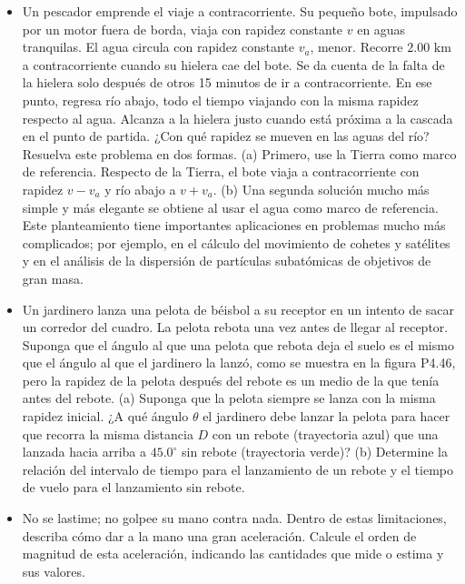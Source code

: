 \documentclass[11pt,a4paper]{article}
\begin{document}
\newpage

\begin{itemize}
    \item[\textbf{45.}] Un pescador emprende el viaje a contracorriente. Su pequeño bote, impulsado por un motor fuera de borda, viaja con rapidez constante $v$ en aguas tranquilas. El agua circula con rapidez constante $v_a$, menor. Recorre $2.00 \text{ km}$ a contracorriente cuando su hielera cae del bote. Se da cuenta de la falta de la hielera solo después de otros 15 minutos de ir a contracorriente. En ese punto, regresa río abajo, todo el tiempo viajando con la misma rapidez respecto al agua. Alcanza a la hielera justo cuando está próxima a la cascada en el punto de partida. ¿Con qué rapidez se mueven en las aguas del río? Resuelva este problema en dos formas. (a) Primero, use la Tierra como marco de referencia. Respecto de la Tierra, el bote viaja a contracorriente con rapidez $v - v_a$ y río abajo a $v + v_a$. (b) Una segunda solución mucho más simple y más elegante se obtiene al usar el agua como marco de referencia. Este planteamiento tiene importantes aplicaciones en problemas mucho más complicados; por ejemplo, en el cálculo del movimiento de cohetes y satélites y en el análisis de la dispersión de partículas subatómicas de objetivos de gran masa.
    \vspace*{7cm}

    \item[\textbf{46.}] Un jardinero lanza una pelota de béisbol a su receptor en un intento de sacar un corredor del cuadro. La pelota rebota una vez antes de llegar al receptor. Suponga que el ángulo al que una pelota que rebota deja el suelo es el mismo que el ángulo al que el jardinero la lanzó, como se muestra en la figura P4.46, pero la rapidez de la pelota después del rebote es un medio de la que tenía antes del rebote. (a) Suponga que la pelota siempre se lanza con la misma rapidez inicial. ¿A qué ángulo $\theta$ el jardinero debe lanzar la pelota para hacer que recorra la misma distancia $D$ con un rebote (trayectoria azul) que una lanzada hacia arriba a $45.0^\circ$ sin rebote (trayectoria verde)? (b) Determine la relación del intervalo de tiempo para el lanzamiento de un rebote y el tiempo de vuelo para el lanzamiento sin rebote.
    \vspace*{7cm}

    \item[\textbf{47.}] No se lastime; no golpee su mano contra nada. Dentro de estas limitaciones, describa cómo dar a la mano una gran aceleración. Calcule el orden de magnitud de esta aceleración, indicando las cantidades que mide o estima y sus valores.
    \vspace*{6cm}


\end{itemize}
\end{document}
